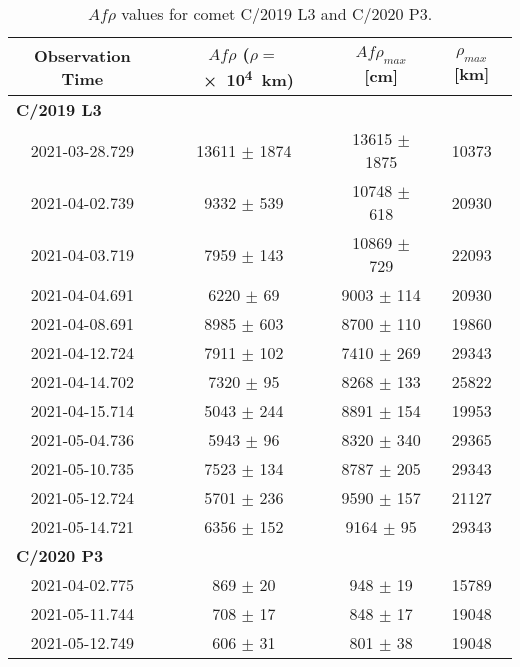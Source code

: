 \begin{table}
    \centering
    \caption{$Af\rho$ values for comet C/2019 L3 and C/2020 P3. }\label{tab:afrho}
    \begin{threeparttable}
        \begin{tabular}{cccc}
            \toprule
            Observation Time & $Af\rho$ ($\rho =$ \SI{e4}{\km}) & $Af\rho_{max}$ [\si{\cm}] & $\rho_{max}$ [\si{\km}]\\
            \midrule
            \multicolumn{4}{l}{\textbf{C/2019 L3}} \\
            2021-03-28.729 & 13611 $\pm$ 1874 & 13615 $\pm$ 1875 & 10373 \\
            2021-04-02.739 & 9332 $\pm$ 539 & 10748 $\pm$ 618 & 20930 \\
            2021-04-03.719 & 7959 $\pm$ 143 & 10869 $\pm$ 729 & 22093 \\
            2021-04-04.691 & 6220 $\pm$ 69 & 9003 $\pm$ 114 & 20930 \\
            2021-04-08.691 & 8985 $\pm$ 603 & 8700 $\pm$ 110 & 19860 \\
            2021-04-12.724 & 7911 $\pm$ 102 & 7410 $\pm$ 269 & 29343 \\
            2021-04-14.702 & 7320 $\pm$ 95 & 8268 $\pm$ 133 & 25822 \\
            2021-04-15.714 & 5043 $\pm$ 244 & 8891 $\pm$ 154 & 19953 \\
            2021-05-04.736 & 5943 $\pm$ 96 & 8320 $\pm$ 340 & 29365 \\
            2021-05-10.735 & 7523 $\pm$ 134 & 8787 $\pm$ 205 & 29343 \\
            2021-05-12.724 & 5701 $\pm$ 236 & 9590 $\pm$ 157 & 21127 \\
            2021-05-14.721 & 6356 $\pm$ 152 & 9164 $\pm$ 95 & 29343 \\
            \multicolumn{4}{l}{\textbf{C/2020 P3}} \\
            2021-04-02.775 & 869 $\pm$ 20 & 948 $\pm$ 19 & 15789 \\
            2021-05-11.744 & 708 $\pm$ 17 & 848 $\pm$ 17 & 19048 \\
            2021-05-12.749 & 606 $\pm$ 31 & 801 $\pm$ 38 & 19048 \\
            \bottomrule
        \end{tabular}
    \end{threeparttable}
\end{table}


